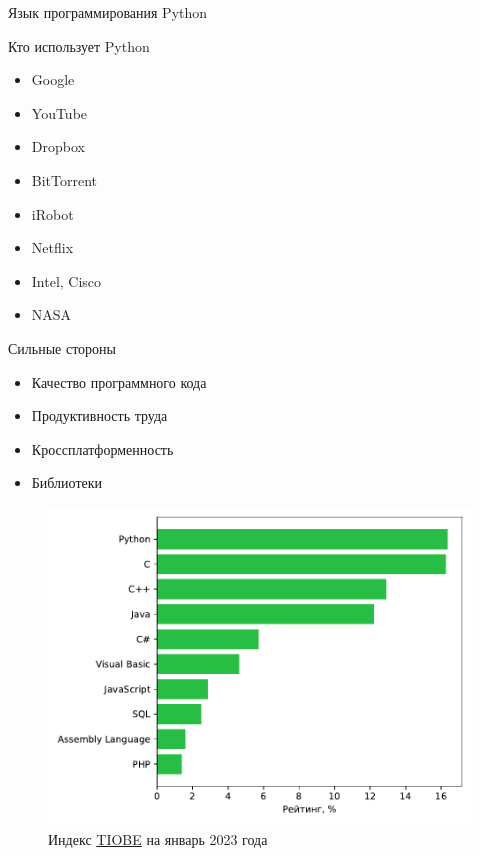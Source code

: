 \documentclass[aspectratio=169]{beamer}	%
\begin{document}
\begin{frame}[fragile]{Язык программирования Python}
\scriptsize
\begin{minipage}{.39\textwidth}
\begin{alertblock}{Кто использует Python}
\begin{itemize}
	\item Google
	\item YouTube
	\item Dropbox
	\item BitTorrent
	\item iRobot
	\item Netflix
	\item Intel, Cisco
	\item NASA
\end{itemize}
\end{alertblock}
\begin{alertblock}{Сильные стороны}
\begin{itemize}
	\item Качество программного кода
	\item Продуктивность труда
	\item Кроссплатформенность
	\item Библиотеки
\end{itemize}
\end{alertblock}
\end{minipage}
\begin{minipage}{.6\textwidth}
\begin{figure}[h!]
	\includegraphics[width=\linewidth]{./pics/tiobe}
	\caption{Индекс \href{https://www.tiobe.com/tiobe-index/}{\textcolor{linkcolor}{TIOBE}} на январь 2023 года}
\end{figure}
\end{minipage}
\vfill
\end{frame}
\end{document}
